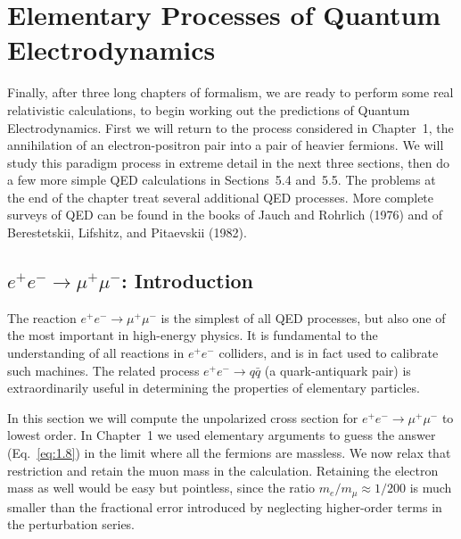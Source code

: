 \chapter{Elementary Processes of Quantum Electrodynamics}

Finally, after three long chapters of formalism, we are ready to perform some
real relativistic calculations, to begin working out the predictions of Quantum
Electrodynamics.  First we will return to the process considered in Chapter~1,
the annihilation of an electron-positron pair into a pair of heavier fermions.
We will study this paradigm process in extreme detail in the next three
sections, then do a few more simple QED calculations in Sections~5.4 and~5.5.
The problems at the end of the chapter treat several additional QED processes.
More complete surveys of QED can be found in the books of Jauch and Rohrlich
(1976) and of Berestetskii, Lifshitz, and Pitaevskii (1982).

\section{$e^{+}e^{-}\to\mu^{+}\mu^{-}$: Introduction}

The reaction $e^{+}e^{-}\to\mu^{+}\mu^{-}$ is the simplest of all QED processes,
but also one of the most important in high-energy physics.  It is fundamental
to the understanding of all reactions in $e^{+}e^{-}$ colliders, and is in fact
used to calibrate such machines.  The related process $e^{+}e^{-}\to q\bar{q}$
(a quark-antiquark pair) is extraordinarily useful in determining the
properties of elementary particles.

In this section we will compute the unpolarized cross section for
$e^{+}e^{-}\to\mu^{+}\mu^{-}$ to lowest order.  In Chapter~1 we used elementary
arguments to guess the answer (Eq.~\eqref{eq:1.8}) in the limit where all the
fermions are massless.  We now relax that restriction and retain the muon
mass in the calculation.  Retaining the electron mass as well would be easy
but pointless, since the ratio $m_e/m_\mu \approx 1/200$ is much smaller than
the fractional error introduced by neglecting higher-order terms in the
perturbation series.

